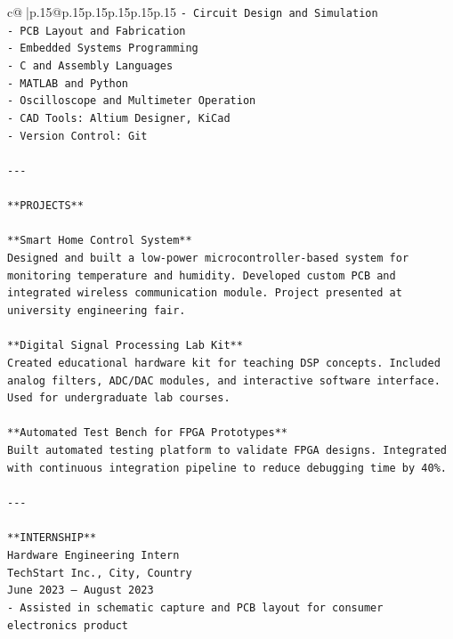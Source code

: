 \documentclass{article}
\begin{document}
{\begin{supertabular}{c@{$\;$}|p{.15\linewidth}@{}p{.15\linewidth}p{.15\linewidth}p{.15\linewidth}p{.15\linewidth}p{.15\linewidth}}
{{{\texttt{{-} Circuit Design and Simulation  } \\
\texttt{{-} PCB Layout and Fabrication  } \\
\texttt{{-} Embedded Systems Programming  } \\
\texttt{{-} C and Assembly Languages  } \\
\texttt{{-} MATLAB and Python  } \\
\texttt{{-} Oscilloscope and Multimeter Operation  } \\
\texttt{{-} CAD Tools: Altium Designer, KiCad  } \\
\texttt{{-} Version Control: Git  } \\
\\ 
\texttt{{-}{-}{-}} \\
\\ 
\texttt{**PROJECTS**  } \\
\\ 
\texttt{**Smart Home Control System**  } \\
\texttt{Designed and built a low{-}power microcontroller{-}based system for monitoring temperature and humidity. Developed custom PCB and integrated wireless communication module. Project presented at university engineering fair.  } \\
\\ 
\texttt{**Digital Signal Processing Lab Kit**  } \\
\texttt{Created educational hardware kit for teaching DSP concepts. Included analog filters, ADC/DAC modules, and interactive software interface. Used for undergraduate lab courses.  } \\
\\ 
\texttt{**Automated Test Bench for FPGA Prototypes**  } \\
\texttt{Built automated testing platform to validate FPGA designs. Integrated with continuous integration pipeline to reduce debugging time by 40\%.  } \\
\\ 
\texttt{{-}{-}{-}} \\
\\ 
\texttt{**INTERNSHIP**  } \\
\texttt{Hardware Engineering Intern  } \\
\texttt{TechStart Inc., City, Country  } \\
\texttt{June 2023 – August 2023  } \\
\texttt{{-} Assisted in schematic capture and PCB layout for consumer electronics product  } \\
}}}
\end{supertabular}}
\end{document}
